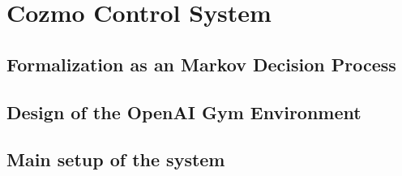\section{Cozmo Control System}



\subsection{Formalization as an Markov Decision Process}



\subsection{Design of the OpenAI Gym Environment}



\subsection{Main setup of the system}

